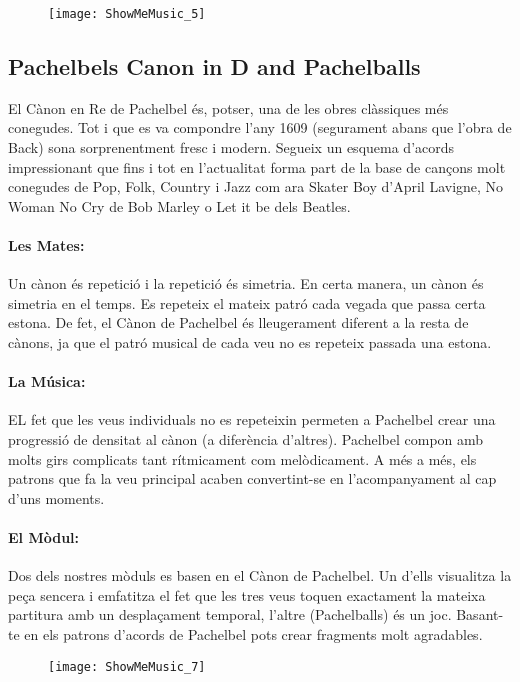 \begin{figure}[h]
\centering
\texttt{[image: ShowMeMusic\_5]}
\end{figure}


\subsection{Pachelbels Canon in D and Pachelballs}
El Cànon en Re de Pachelbel és, potser, una de les obres clàssiques més conegudes. Tot i que es va compondre l'any 1609 (segurament abans que l'obra de Back) sona sorprenentment fresc i modern. Segueix un esquema d'acords impressionant que fins i tot en l'actualitat forma part de la base de cançons molt conegudes de Pop, Folk, Country i Jazz com ara Skater Boy d'April Lavigne, No Woman No Cry de Bob Marley o Let it be dels Beatles. 

\paragraph{Les Mates:} Un cànon és repetició i la repetició és simetria. En certa manera, un cànon és simetria en el temps. Es repeteix el mateix patró cada vegada que passa certa estona. De fet, el Cànon de Pachelbel és lleugerament diferent a la resta de cànons, ja que el patró musical de cada veu no es repeteix passada una estona. 

\paragraph{La Música:} EL fet que les veus individuals no es repeteixin permeten a Pachelbel crear una progressió de densitat al cànon (a diferència d'altres). Pachelbel compon amb molts girs complicats tant rítmicament com melòdicament. A més a més, els patrons que fa la veu principal acaben convertint-se en l'acompanyament al cap d'uns moments. 

\paragraph{El  Mòdul:} Dos dels nostres mòduls es basen en el Cànon de Pachelbel. Un d'ells visualitza la peça sencera i emfatitza el fet que les tres veus toquen exactament la mateixa partitura amb un desplaçament temporal, l'altre (Pachelballs) és un joc. Basant-te en els patrons d'acords de Pachelbel pots crear fragments molt agradables. 

\begin{figure}
\centering
\texttt{[image: ShowMeMusic\_7]}
\end{figure}


